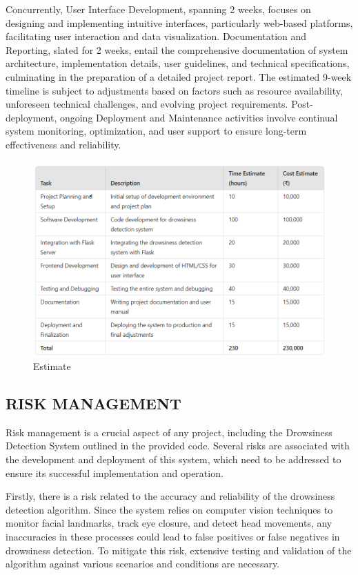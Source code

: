 \documentclass[12pt]{article}
\begin{document}
Concurrently, User Interface Development, spanning 2 weeks, focuses on designing and implementing intuitive interfaces, particularly web-based platforms, facilitating user interaction and data visualization. Documentation and Reporting, slated for 2 weeks, entail the comprehensive documentation of system architecture, implementation details, user guidelines, and technical specifications, culminating in the preparation of a detailed project report. The estimated 9-week timeline is subject to adjustments based on factors such as resource availability, unforeseen technical challenges, and evolving project requirements. Post-deployment, ongoing Deployment and Maintenance activities involve continual system monitoring, optimization, and user support to ensure long-term effectiveness and reliability.

\begin{figure}[h]
\centering
\includegraphics[width=1.0\textwidth]{estimate}
\caption{Estimate }
\end{figure}
\FloatBarrier


\subsection{RISK MANAGEMENT }
Risk management is a crucial aspect of any project, including the Drowsiness Detection System outlined in the provided code. Several risks are associated with the development and deployment of this system, which need to be addressed to ensure its successful implementation and operation.

Firstly, there is a risk related to the accuracy and reliability of the drowsiness detection algorithm. Since the system relies on computer vision techniques to monitor facial landmarks, track eye closure, and detect head movements, any inaccuracies in these processes could lead to false positives or false negatives in drowsiness detection. To mitigate this risk, extensive testing and validation of the algorithm against various scenarios and conditions are necessary.
\end{document}

